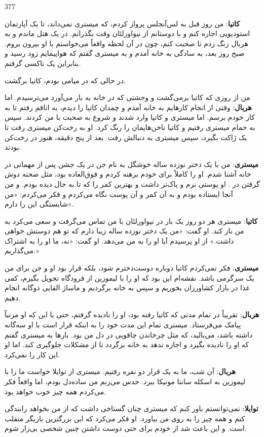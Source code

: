 \begin{LTR}
377
\end{LTR}

\noindent
\textbf{کاتیا}: من روز قبل به لس‌آنجلس پرواز کردم، که میستری نمی‌داند، تا یک آپارتمان استودیویی اجاره کنم و با دوستانم از نیواورلئان وقت بگذرانم. در یک هتل ماندم و به هربال زنگ زدم تا صحبت کنم، چون در آن لحظه واقعاً می‌خواستم با او بیرون بروم. صبح روز بعد، به سادگی به خانه آمدم و به میستری گفتم که هواپیمایم زود رسید و بنابراین یک تاکسی گرفتم.

در حالی که در میامی بودم، کاتیا برگشت.

من از روزی که کاتیا برمی‌گشت و وحشتی که در خانه به بار می‌آورد می‌ترسیدم. اما \textbf{هربال}: وقتی از انجام کارهایم به خانه آمدم و چمدان کاتیا را دیدم، به اتاقم رفتم تا به کار خودم برسم. اما میستری و کاتیا وارد شدند و شروع به صحبت با من کردند. سپس به حمام میستری رفتیم و کاتیا ناخن‌هایمان را رنگ کرد. او به رخت‌کن میستری رفت تا یک ژاکت بگیرد، سپس میستری به دنبالش رفت. بعد از پنج دقیقه، هنوز در رخت‌کن بودند.

\textbf{میستری}: من با یک دختر نوزده ساله خوشگل به نام جن در یک جشن پس از مهمانی در خانه آشنا شدم. او را کاملاً برای خودم برهنه کردم و فوق‌العاده بود، مثل صحنه دوش گرفتن در . او پوستی نرم و پاک‌تر داشت و بهترین کمر را که تا به حال دیده بودم. و من آنجا ایستاده بودم و به آن کمر و آن پوست نگاه می‌کردم و فکر می‌کردم: «من شایستگی این را دارم».

\textbf{کاتیا}: میستری هر دو روز یک بار در نیواورلئان با من تماس می‌گرفت و سعی می‌کرد به من ناز کند. او گفت: «من یک دختر نوزده ساله زیبا دارم که تو هم دوستش خواهی داشت.» از او پرسیدم آیا او را به من می‌دهد. او گفت: «نه، ما او را به اشتراک می‌گذاریم.»

\textbf{میستری}: فکر نمی‌کردم کاتیا دوباره دوست‌دخترم شود، بلکه قرار بود او و جن برای من یک سرگرمی باشد. نقشه‌ام این بود که او را با لیموزین از فرودگاه تحویل بگیرم، کمی غذا در بازار کشاورزان بخوریم و سپس به خانه برگردیم و ماساژ القایی دوگانه انجام دهیم.

\textbf{هربال}: تقریباً در تمام مدتی که کاتیا رفته بود، او را نادیده گرفتم، حتی با این که او مرتباً پیامک می‌فرستاد. میستری تمام این مدت خود را به اینکه قرار است با او سه‌گانه داشته باشد، می‌بالید، که مثل چرخاندن چاقویی در دل من بود. بارها به میستری گفتم که او را نادیده بگیرد و اجازه ندهد به خانه برگردد تا از مشکلات جلوگیری کند. اما او این کار را نمی‌کرد.

\textbf{هربال}: آن شب، ما به یک قرار دو نفره رفتیم. میستری از توایلا خواست ما را با لیموزین به اسکله سانتا مونیکا ببرد. حدس می‌زنم من ساده‌دل بودم، اما واقعاً فکر می‌کردم همه چیز خوب خواهد بود.

\textbf{توایلا}: نمی‌توانستم باور کنم که میستری چنان گستاخی داشت که از من بخواهد رانندگی کنم و همه چیز را به روی من بیاورد. او فکر می‌کرد که این بزرگترین بازیگر متقلب است. و این باعث شد از خودم برای حتی دوست داشتن چنین شخصی بی‌زار شوم.